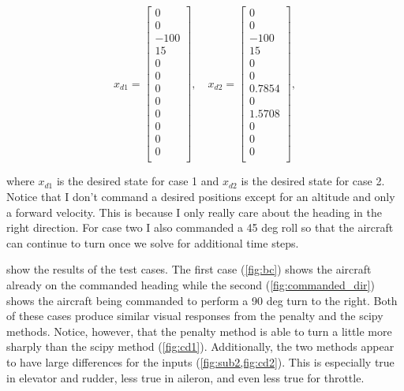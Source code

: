 \documentclass{article}
\begin{document}
\begin{equation}
x_{d1}=
\begin{bmatrix}
	0 \\ 0 \\ -100 \\ 15 \\ 0 \\ 0 \\ 0 \\ 0 \\ 0 \\ 0 \\ 0 \\ 0 \\
\end{bmatrix},  \quad
x_{d2}=
\begin{bmatrix}
0 \\ 0 \\ -100 \\ 15 \\ 0 \\ 0 \\ 0.7854 \\ 0 \\ 1.5708 \\ 0 \\ 0 \\ 0 \\
\end{bmatrix}, 
\end{equation}

where $x_{d1}$ is the desired state for case 1 and $x_{d2}$ is the desired state for case 2. Notice that I don't command a desired positions except for an altitude and only a forward velocity. This is because I only really care about the heading in the right direction. For case two I also commanded a 45 deg roll so that the aircraft can continue to turn once we solve for additional time steps.


 show the results of the test cases. The first case (\cref{fig:bc}) shows the aircraft already on the commanded heading while the second (\cref{fig:commanded_dir}) shows the aircraft being commanded to perform a 90 deg turn to the right. Both of these cases produce similar visual responses from the penalty and the scipy methods. Notice, however, that the penalty method is able to turn a little more sharply than the scipy method (\cref{fig:cd1}). Additionally, the two methods appear to have large differences for the inputs (\cref{fig:sub2,fig:cd2}). This is especially true in elevator and rudder, less true in aileron, and even less true for throttle.
\end{document}
